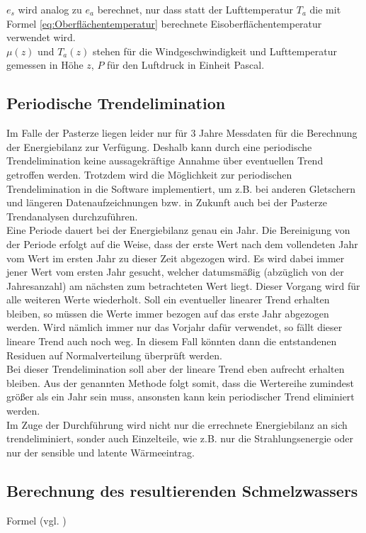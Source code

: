 \documentclass[12pt,a4paper]{article}
\begin{document}
$e_s$ wird analog zu $e_a$ berechnet, nur dass statt der Lufttemperatur $T_a$ die mit Formel \ref{eq:Oberflächentemperatur} berechnete Eisoberflächentemperatur verwendet wird.\\
$\mu(z)$ und $T_a(z)$ stehen für die Windgeschwindigkeit und Lufttemperatur gemessen in Höhe $z$, $P$ für den Luftdruck in Einheit Pascal.


\subsection{Periodische Trendelimination}\label{Periodische Trendelimination}
Im Falle der Pasterze liegen leider nur für 3 Jahre Messdaten für die Berechnung der Energiebilanz zur Verfügung. Deshalb kann durch eine periodische Trendelimination keine aussagekräftige Annahme über eventuellen Trend getroffen werden. Trotzdem wird die Möglichkeit zur periodischen Trendelimination in die Software implementiert, um z.B. bei anderen Gletschern und längeren Datenaufzeichnungen bzw. in Zukunft auch bei der Pasterze Trendanalysen durchzuführen.\\

Eine Periode dauert bei der Energiebilanz genau ein Jahr. Die Bereinigung von der Periode erfolgt auf die Weise, dass der erste Wert nach dem vollendeten Jahr vom Wert im ersten Jahr zu dieser Zeit abgezogen wird. Es wird dabei immer jener Wert vom ersten Jahr gesucht, welcher datumsmäßig (abzüglich von der Jahresanzahl) am nächsten zum betrachteten Wert liegt. Dieser Vorgang wird für alle weiteren Werte wiederholt. Soll ein eventueller linearer Trend erhalten bleiben, so müssen die Werte immer bezogen auf das erste Jahr abgezogen werden. Wird nämlich immer nur das Vorjahr dafür verwendet, so fällt dieser lineare Trend auch noch weg. In diesem Fall könnten dann die entstandenen Residuen auf Normalverteilung überprüft werden.\\
Bei dieser Trendelimination soll aber der lineare Trend eben aufrecht erhalten bleiben. Aus der genannten Methode folgt somit, dass die Wertereihe zumindest größer als ein Jahr sein muss, ansonsten kann kein periodischer Trend eliminiert werden.\\

Im Zuge der Durchführung wird nicht nur die errechnete Energiebilanz an sich trendeliminiert, sonder auch Einzelteile, wie z.B. nur die Strahlungsenergie oder nur der sensible und latente Wärmeeintrag.


\subsection{Berechnung des resultierenden Schmelzwassers}
Formel (vgl. \cite[142]{ThePhysicsOfGlaciers})
\end{document}
